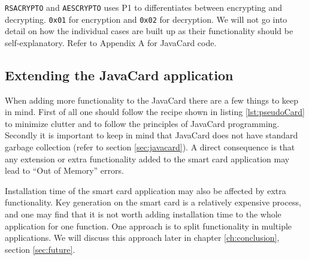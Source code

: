 \texttt{RSACRYPTO} and \texttt{AESCRYPTO} uses P1 to differentiates between encrypting and decrypting. \texttt{0x01} for encryption and \texttt{0x02} for decryption.
We will not go into detail on how the individual cases are built up as their functionality should be self-explanatory. Refer to Appendix A for JavaCard code.

\subsection{Extending the JavaCard application}
When adding more functionality to the JavaCard there are a few things to keep in mind. First of all one should follow the recipe shown in listing \ref{lst:pseudoCard} to minimize clutter and to follow the principles of JavaCard programming. Secondly it is important to keep in mind that JavaCard does not have standard garbage collection (refer to section \ref{sec:javacard}). A direct consequence is that any extension or extra functionality added to the smart card application may lead to ``Out of Memory'' errors.

Installation time of the smart card application may also be affected by extra functionality. Key generation on the smart card is a relatively expensive process, and one may find that it is not worth adding installation time to the whole application for one function. One approach is to split functionality in multiple applications. We will discuss this approach later in chapter \ref{ch:conclusion}, section \ref{sec:future}.
